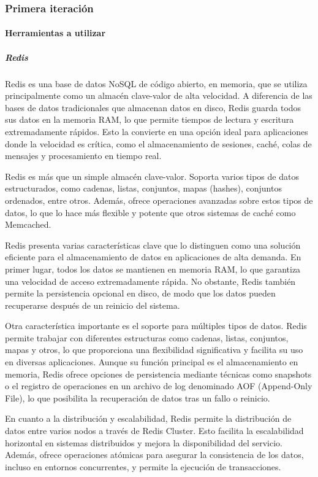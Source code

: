 

\subsubsection{Primera iteración}

\paragraph{Herramientas a utilizar}

\subparagraph{Redis}

Redis es una base de datos NoSQL de código abierto, en memoria, que se utiliza principalmente como un almacén clave-valor de alta velocidad. A diferencia de las bases de datos tradicionales que almacenan datos en disco, Redis guarda todos sus datos en la memoria RAM, lo que permite tiempos de lectura y escritura extremadamente rápidos. Esto la convierte en una opción ideal para aplicaciones donde la velocidad es crítica, como el almacenamiento de sesiones, caché, colas de mensajes y procesamiento en tiempo real.

Redis es más que un simple almacén clave-valor. Soporta varios tipos de datos estructurados, como cadenas, listas, conjuntos, mapas (hashes), conjuntos ordenados, entre otros. Además, ofrece operaciones avanzadas sobre estos tipos de datos, lo que lo hace más flexible y potente que otros sistemas de caché como Memcached.

Redis presenta varias características clave que lo distinguen como una solución eficiente para el almacenamiento de datos en aplicaciones de alta demanda. En primer lugar, todos los datos se mantienen en memoria RAM, lo que garantiza una velocidad de acceso extremadamente rápida. No obstante, Redis también permite la persistencia opcional en disco, de modo que los datos pueden recuperarse después de un reinicio del sistema.

Otra característica importante es el soporte para múltiples tipos de datos. Redis permite trabajar con diferentes estructuras como cadenas, listas, conjuntos, mapas y otros, lo que proporciona una flexibilidad significativa y facilita su uso en diversas aplicaciones. Aunque su función principal es el almacenamiento en memoria, Redis ofrece opciones de persistencia mediante técnicas como snapshots o el registro de operaciones en un archivo de log denominado AOF (Append-Only File), lo que posibilita la recuperación de datos tras un fallo o reinicio.

En cuanto a la distribución y escalabilidad, Redis permite la distribución de datos entre varios nodos a través de Redis Cluster. Esto facilita la escalabilidad horizontal en sistemas distribuidos y mejora la disponibilidad del servicio. Además, ofrece operaciones atómicas para asegurar la consistencia de los datos, incluso en entornos concurrentes, y permite la ejecución de transacciones.

